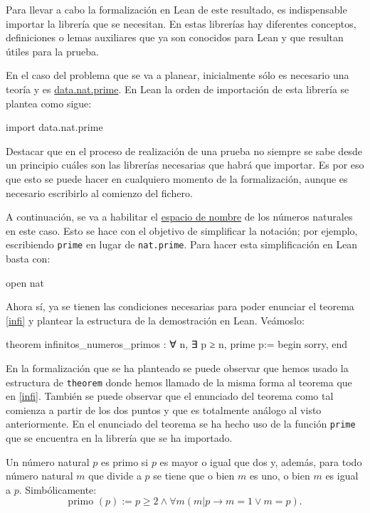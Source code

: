 Para llevar a cabo la formalización en Lean de este resultado, es
indispensable importar la librería que se necesitan. En estas librerías
hay diferentes conceptos, definiciones o lemas auxiliares que ya son
conocidos para Lean y que resultan útiles para la prueba.

En el caso del problema que se va a planear, inicialmente sólo es necesario
una teoría y es
\href{https://github.com/leanprover-community/mathlib/blob/master/src/data/nat/prime.lean}
{data.nat.prime}. En Lean la orden de importación de esta librería se plantea
como sigue:
\begin{leancode}
import data.nat.prime
\end{leancode}

\begin{nota}
  Destacar que en el proceso de realización de una prueba no siempre se sabe
  desde un principio cuáles son las librerías necesarias que habrá que importar.
  Es por eso que esto se puede hacer en cualquiero momento de la formalización,
  aunque es necesario escribirlo al comienzo del fichero.
\end{nota}

A continuación, se va a habilitar el
\href{https://leanprover.github.io/reference/other_commands.html#namespaces}
{espacio de nombre} de los números naturales en este caso. Esto se hace
con el objetivo de simplificar la notación; por ejemplo, escribiendo
\texttt{prime} en lugar de \texttt{nat.prime}. Para hacer esta
simplificación en Lean basta con:
\begin{leancode}
open nat
\end{leancode}

Ahora sí, ya se tienen las condiciones necesarias para poder enunciar el
teorema \ref{infi} y plantear la estructura de la demostración en Lean.
Veámoslo:
\begin{leancode}
theorem infinitos_numeros_primos : ∀ n, ∃ p ≥ n, prime p:=
begin
  sorry,
end
\end{leancode}

En la formalización que se ha planteado se puede observar que hemos usado la
estructura de \texttt{theorem} donde hemos llamado de la misma forma al
teorema que en \ref{infi}. También se puede observar que el enunciado del
teorema como tal comienza a partir de los dos puntos y que es totalmente
análogo al visto anteriormente. En el enunciado del teorema se ha hecho uso
de la función \texttt{prime} que se encuentra en la librería que se ha
importado.

\begin{definicion}
  Un número natural \(p\) es primo si \(p\) es mayor o igual que dos y,
  además, para todo número natural \(m\) que divide a \(p\) se tiene
  que o bien \(m\) es uno, o bien \(m\) es igual a \(p\).
  Simbólicamente:
  \begin{equation*}
    \text{primo }(p) := p ≥ 2 ∧ ∀ m (m | p → m = 1 ∨ m = p).
  \end{equation*}
\end{definicion}

